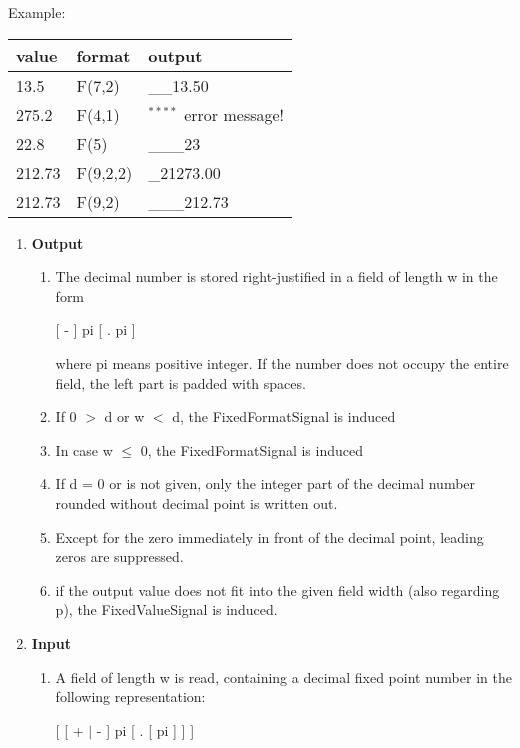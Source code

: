 \begin{removed}
Example:

\begin{tabular}{lll}
value  & format   & output \\ \hline
13.5   & F(7,2)   & \_\_13.50  \\
275.2  & F(4,1)   & $^{****}$ \x \x error message! \\
22.8   & F(5)     & \_\_\_23 \\
212.73 & F(9,2,2) & \_21273.00 \\
212.73 & F(9,2)   & \_\_\_212.73
\end{tabular}
\end{removed}

\begin{added}
\begin{enumerate}
\item {\bf Output}
\begin{enumerate}
\item The decimal number is stored right-justified in a field of length
w in the form

[ - ] pi [ . pi ]

where pi means positive integer. If the number does not occupy the
entire field, the left part is padded with spaces.
\item If 0 $>$ d or w $<$ d, the FixedFormatSignal is induced
\item In case w $\leq$ 0, the FixedFormatSignal is induced
\item If d = 0 or is not given, only the integer part of the decimal
number rounded without decimal point is written out.
\item Except for the zero immediately in front of the decimal point,
leading zeros are suppressed.
\item if the output value does not fit into the given field width 
   (also regarding p), the FixedValueSignal is induced.
\end{enumerate}
\item {\bf Input}
\begin{enumerate}
\item A field of length w is read, containing a decimal fixed point
number in the following representation:

[ [ + $\mid$ - ] pi [ . [ pi ] ] ]


\end{enumerate}
\end{enumerate}
\end{added}
